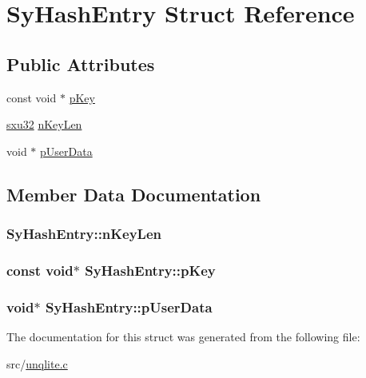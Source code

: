 \hypertarget{struct_sy_hash_entry}{\section{Sy\-Hash\-Entry Struct Reference}
\label{d8/d2f/struct_sy_hash_entry}
}
\subsection*{Public Attributes}
\begin{DoxyCompactItemize}
\item 
const void $\ast$ \hyperlink{struct_sy_hash_entry_ad6ff9058ae2f167fd6d4d6b4bebb81d6}{p\-Key}
\item 
\hyperlink{unqlite_8c_abc5a8a3f345c200c98c485551f49666e}{sxu32} \hyperlink{struct_sy_hash_entry_a96f06f4a0631fa1ff0782d47aef98ec4}{n\-Key\-Len}
\item 
void $\ast$ \hyperlink{struct_sy_hash_entry_a473391e5fe71cbabf60ebfef129e5d3b}{p\-User\-Data}
\end{DoxyCompactItemize}


\subsection{Member Data Documentation}
\hypertarget{struct_sy_hash_entry_a96f06f4a0631fa1ff0782d47aef98ec4}{
\subsubsection[{n\-Key\-Len}]{ Sy\-Hash\-Entry\-::n\-Key\-Len}}\label{d8/d2f/struct_sy_hash_entry_a96f06f4a0631fa1ff0782d47aef98ec4}
\hypertarget{struct_sy_hash_entry_ad6ff9058ae2f167fd6d4d6b4bebb81d6}{
\subsubsection[{p\-Key}]{\setlength{\rightskip}{0pt plus 5cm}const void$\ast$ Sy\-Hash\-Entry\-::p\-Key}}\label{d8/d2f/struct_sy_hash_entry_ad6ff9058ae2f167fd6d4d6b4bebb81d6}
\hypertarget{struct_sy_hash_entry_a473391e5fe71cbabf60ebfef129e5d3b}{
\subsubsection[{p\-User\-Data}]{\setlength{\rightskip}{0pt plus 5cm}void$\ast$ Sy\-Hash\-Entry\-::p\-User\-Data}}\label{d8/d2f/struct_sy_hash_entry_a473391e5fe71cbabf60ebfef129e5d3b}


The documentation for this struct was generated from the following file\-:\begin{DoxyCompactItemize}
\item 
src/\hyperlink{unqlite_8c}{unqlite.\-c}\end{DoxyCompactItemize}
